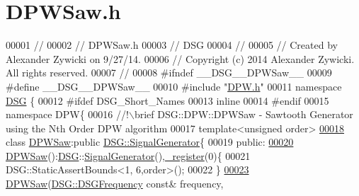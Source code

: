 \hypertarget{_d_p_w_saw_8h_source}{\section{D\+P\+W\+Saw.\+h}
\label{_d_p_w_saw_8h_source}
}

\begin{DoxyCode}
00001 \textcolor{comment}{//}
00002 \textcolor{comment}{//  DPWSaw.h}
00003 \textcolor{comment}{//  DSG}
00004 \textcolor{comment}{//}
00005 \textcolor{comment}{//  Created by Alexander Zywicki on 9/27/14.}
00006 \textcolor{comment}{//  Copyright (c) 2014 Alexander Zywicki. All rights reserved.}
00007 \textcolor{comment}{//}
00008 \textcolor{preprocessor}{#ifndef \_\_DSG\_\_DPWSaw\_\_}
00009 \textcolor{preprocessor}{#define \_\_DSG\_\_DPWSaw\_\_}
00010 \textcolor{preprocessor}{#include "\hyperlink{_d_p_w_8h}{DPW.h}"}
00011 \textcolor{keyword}{namespace }\hyperlink{namespace_d_s_g}{DSG} \{
00012 \textcolor{preprocessor}{#ifdef DSG\_Short\_Names}
00013     \textcolor{keyword}{inline}
00014 \textcolor{preprocessor}{#endif}
00015     \textcolor{keyword}{namespace }DPW\{\textcolor{comment}{}
00016 \textcolor{comment}{        //!\(\backslash\)brief DSG::DPW::DPWSaw - Sawtooth Generator using the Nth Order DPW algorithm }
00017 \textcolor{comment}{}        \textcolor{keyword}{template}<\textcolor{keywordtype}{unsigned} order>
\hypertarget{_d_p_w_saw_8h_source_l00018}{}\hyperlink{class_d_s_g_1_1_d_p_w_1_1_d_p_w_saw}{00018}         \textcolor{keyword}{class }\hyperlink{class_d_s_g_1_1_d_p_w_1_1_d_p_w_saw}{DPWSaw}:\textcolor{keyword}{public} \hyperlink{class_d_s_g_1_1_signal_generator}{DSG::SignalGenerator}\{
00019         \textcolor{keyword}{public}:
\hypertarget{_d_p_w_saw_8h_source_l00020}{}\hyperlink{class_d_s_g_1_1_d_p_w_1_1_d_p_w_saw_ae9409342bec9d28c6e3e5235619f0c17}{00020}             \hyperlink{class_d_s_g_1_1_d_p_w_1_1_d_p_w_saw_ae9409342bec9d28c6e3e5235619f0c17}{DPWSaw}():\hyperlink{namespace_d_s_g}{DSG}::\hyperlink{class_d_s_g_1_1_signal_generator}{SignalGenerator}(),\hyperlink{class_d_s_g_1_1_d_p_w_1_1_d_p_w_saw_a5b9fcbe7361f56358afd2728c5de4014}{\_register}(0)\{
00021                 DSG::StaticAssertBounds<1, 6,order>();
00022             \}
\hypertarget{_d_p_w_saw_8h_source_l00023}{}\hyperlink{class_d_s_g_1_1_d_p_w_1_1_d_p_w_saw_a750142d70e22ccfb961edc73b13386f6}{00023}             \hyperlink{class_d_s_g_1_1_d_p_w_1_1_d_p_w_saw_a750142d70e22ccfb961edc73b13386f6}{DPWSaw}(\hyperlink{namespace_d_s_g_a4315a061386fa1014fda09b15d3a6973}{DSG::DSGFrequency} \textcolor{keyword}{const}& frequency,

\end{DoxyCode}

